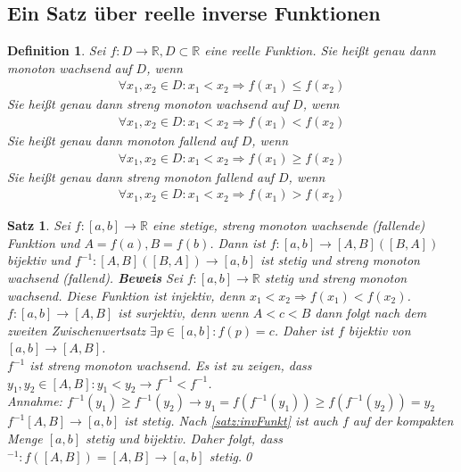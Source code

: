 \documentclass[ngerman,titlepage,twoside, parskip=half*]{scrreprt}
\newcommand*{\R}{\mathbb{R}}
\theoremstyle{break}
\newtheorem{theorem}{Satz}[section]
\newtheorem{definition}{Definition}[chapter]
\theoremstyle{nonumberbreak}
\begin{document}
\subsection{Ein Satz über reelle inverse Funktionen}
\begin{definition}
Sei $f\colon D\rightarrow\R, D\subset \R$ eine reelle Funktion. Sie heißt genau dann \emph{monoton wachsend} auf $D$, wenn
\begin{gather*}\forall x_1,x_2\in D\colon x_1<x_2\Rightarrow f(x_1)\leq f(x_2)\end{gather*}
Sie heißt genau dann \emph{streng monoton wachsend} auf $D$, wenn
\begin{gather*}\forall x_1,x_2\in D\colon x_1<x_2\Rightarrow f(x_1)<f(x_2)\end{gather*}
Sie heißt genau dann \emph{monoton fallend} auf $D$, wenn
\begin{gather*}\forall x_1,x_2\in D\colon x_1<x_2\Rightarrow f(x_1)\geq f(x_2)\end{gather*}
Sie heißt genau dann \emph{streng monoton fallend} auf $D$, wenn
\begin{gather*}\forall x_1,x_2\in D\colon x_1<x_2\Rightarrow f(x_1)>f(x_2)\end{gather*}
\end{definition}

\begin{theorem}
  \label{satz:reellInvFkt}
Sei $f\colon[a,b]\rightarrow\R$ eine stetige, streng monoton wachsende (fallende) Funktion und $A=f(a), B=f(b)$. Dann ist
$f\colon[a,b]\rightarrow [A,B] ([B,A])$ bijektiv und $f^{-1}\colon[A,B]([B,A])\rightarrow [a,b]$ ist stetig und streng 
monoton wachsend (fallend).
\textbf{Beweis} Sei $f\colon[a,b]\rightarrow\R$ stetig und streng monoton wachsend. Diese Funktion ist injektiv, denn
$x_1<x_2\Rightarrow f(x_1)<f(x_2)$.\\
$f\colon[a,b]\rightarrow[A,B]$ ist surjektiv, denn wenn $A<c<B$ dann folgt nach dem zweiten Zwischenwertsatz $\exists
p\in [a,b]\colon f(p)=c$. Daher ist $f$ bijektiv von $[a,b]\rightarrow [A,B]$.\\
$f^{-1}$ ist streng monoton wachsend. Es ist zu zeigen, dass $y_1,y_2\in [A,B]\colon y_1<y_2\rightarrow f^{-1}<f^{-1}$.\\
Annahme: $f^{-1}(y_1)\geq f^{-1}(y_2)\rightarrow y_1=f(f^{-1}(y_1))\geq f(f^{-1}(y_2))=y_2$\textnormal{\lightning}\\
$f^{-1}[A,B]\rightarrow [a,b]$ ist stetig. Nach \autoref{satz:invFunkt} ist auch $f$ auf der kompakten Menge 
$[a,b]$ stetig und bijektiv. Daher folgt, dass $^{-1}\colon f([A,B])=[A,B]\rightarrow [a,b]$ stetig.\qed
\end{theorem}
\end{document}
